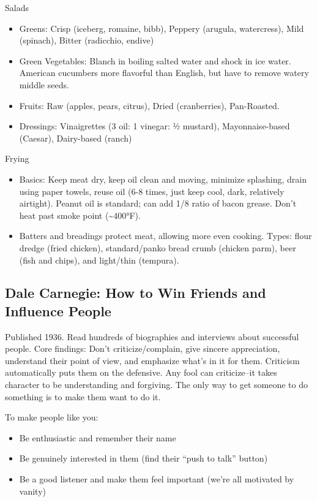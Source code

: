 \documentclass[
]{article}
\begin{document}
Salads

\begin{itemize}
\item
  Greens: Crisp (iceberg, romaine, bibb), Peppery (arugula, watercress),
  Mild (spinach), Bitter (radicchio, endive)
\item
  Green Vegetables: Blanch in boiling salted water and shock in ice
  water. American cucumbers more flavorful than English, but have to
  remove watery middle seeds.
\item
  Fruits: Raw (apples, pears, citrus), Dried (cranberries), Pan-Roasted.
\item
  Dressings: Vinaigrettes (3 oil: 1 vinegar: ½ mustard),
  Mayonnaise-based (Caesar), Dairy-based (ranch)
\end{itemize}

Frying

\begin{itemize}
\item
  Basics: Keep meat dry, keep oil clean and moving, minimize splashing,
  drain using paper towels, reuse oil (6-8 times, just keep cool, dark,
  relatively airtight). Peanut oil is standard; can add 1/8 ratio of
  bacon grease. Don't heat past smoke point (\textasciitilde400°F).
\item
  Batters and breadings protect meat, allowing more even cooking. Types:
  flour dredge (fried chicken), standard/panko bread crumb (chicken
  parm), beer (fish and chips), and light/thin (tempura).
\end{itemize}

\hypertarget{dale-carnegie-how-to-win-friends-and-influence-people}{%
\subsection{Dale Carnegie: How to Win Friends and Influence
People}\label{dale-carnegie-how-to-win-friends-and-influence-people}}

Published 1936. Read hundreds of biographies and interviews about
successful people. Core findings: Don't criticize/complain, give sincere
appreciation, understand their point of view, and emphasize what's in it
for them. Criticism automatically puts them on the defensive. Any fool
can criticize--it takes character to be understanding and forgiving. The
only way to get someone to do something is to make them want to do it.

To make people like you:

\begin{itemize}
\item
  Be enthusiastic and remember their name
\item
  Be genuinely interested in them (find their ``push to talk'' button)
\item
  Be a good listener and make them feel important (we're all motivated
  by vanity)
\end{itemize}
\end{document}
